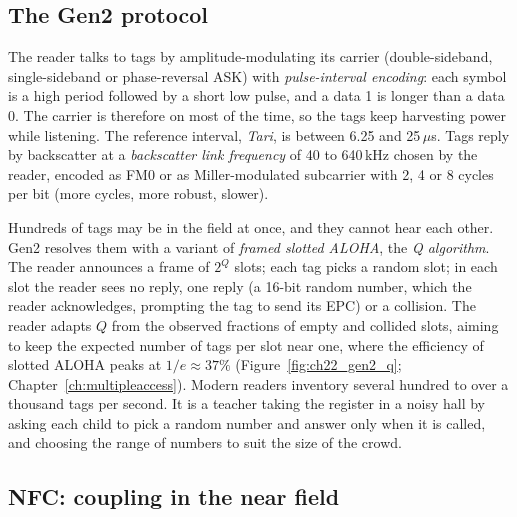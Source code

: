 \subsection{The Gen2 protocol}

The reader talks to tags by amplitude-modulating its carrier (double-sideband, single-sideband or
phase-reversal ASK) with \emph{pulse-interval encoding}: each symbol is a high period followed by a
short low pulse, and a data 1 is longer than a data 0. The carrier is therefore on most of the time,
so the tags keep harvesting power while listening. The reference interval, \emph{Tari}, is between
6.25 and 25\,$\mu$s. Tags reply by backscatter at a \emph{backscatter link frequency} of 40 to 640\,kHz
chosen by the reader, encoded as FM0 or as Miller-modulated subcarrier with 2, 4 or 8 cycles per bit
(more cycles, more robust, slower).


Hundreds of tags may be in the field at once, and they cannot hear each other. Gen2 resolves them with
a variant of \emph{framed slotted ALOHA}, the \emph{Q algorithm}. The reader announces a frame of $2^Q$
slots; each tag picks a random slot; in each slot the reader sees no reply, one reply (a 16-bit random
number, which the reader acknowledges, prompting the tag to send its EPC) or a collision. The reader
adapts $Q$ from the observed fractions of empty and collided slots, aiming to keep the expected number
of tags per slot near one, where the efficiency of slotted ALOHA peaks at $1/e\approx37\%$
(Figure~\ref{fig:ch22_gen2_q}; Chapter~\ref{ch:multipleaccess}). Modern readers inventory several
hundred to over a thousand tags per second. It is a teacher taking the register in a noisy hall by
asking each child to pick a random number and answer only when it is called, and choosing the range of
numbers to suit the size of the crowd.

\subsection{NFC: coupling in the near field}

